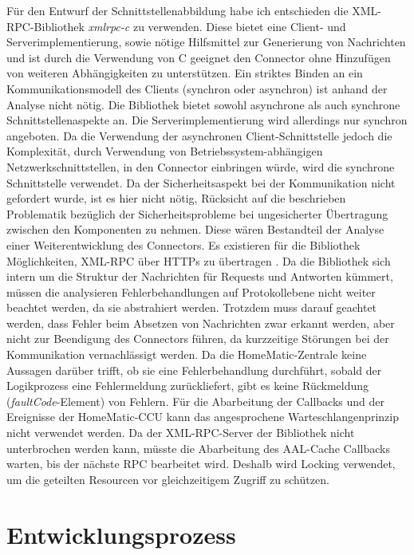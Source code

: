 Für den Entwurf der Schnittstellenabbildung habe ich entschieden die XML-RPC-Bibliothek \emph{xmlrpc-c} \cite{xmlrpc-c} zu verwenden.
Diese bietet eine Client- und Serverimplementierung, sowie nötige Hilfsmittel zur Generierung von Nachrichten und
 ist durch die Verwendung von C geeignet den Connector ohne Hinzufügen von weiteren Abhängigkeiten zu unterstützen.
Ein striktes Binden an ein Kommunikationsmodell des Clients (synchron oder asynchron) ist anhand der Analyse nicht nötig.
Die Bibliothek bietet sowohl asynchrone als auch synchrone Schnittstellenaspekte an.
Die Serverimplementierung wird allerdings nur synchron angeboten.
Da die Verwendung der asynchronen Client-Schnittstelle jedoch die Komplexität, durch Verwendung von Betriebssystem-abhängigen
Netzwerkschnittstellen, in den Connector einbringen würde, wird die synchrone Schnittstelle verwendet.
Da der Sicherheitsaspekt bei der Kommunikation nicht gefordert wurde, ist es hier nicht nötig, Rücksicht auf die
beschrieben Problematik bezüglich der Sicherheitsprobleme bei ungesicherter Übertragung zwischen den Komponenten zu nehmen.
Diese wären Bestandteil der Analyse einer Weiterentwicklung des Connectors.
Es existieren für die Bibliothek Möglichkeiten, XML-RPC über HTTPs zu übertragen \cite{xmlrpc_ssl}.
Da die Bibliothek sich intern um die Struktur der Nachrichten für Requests und Antworten kümmert, müssen die
analysieren Fehlerbehandlungen auf Protokollebene nicht weiter beachtet werden, da sie abstrahiert werden.
Trotzdem muss darauf geachtet werden, dass Fehler beim Absetzen von Nachrichten zwar erkannt werden, aber nicht
zur Beendigung des Connectors führen, da kurzzeitige Störungen bei der Kommunikation vernachlässigt werden.
Da die HomeMatic-Zentrale keine Aussagen darüber trifft, ob sie eine Fehlerbehandlung durchführt, sobald
der Logikprozess eine Fehlermeldung zurückliefert, gibt es keine Rückmeldung (\emph{faultCode}-Element)
von Fehlern.
Für die Abarbeitung der Callbacks und der Ereignisse der HomeMatic-CCU kann das angesprochene Warteschlangenprinzip
nicht verwendet werden.
Da der XML-RPC-Server der Bibliothek nicht unterbrochen werden kann, müsste die Abarbeitung des AAL-Cache
Callbacks warten, bis der nächste RPC bearbeitet wird.
Deshalb wird Locking verwendet, um die geteilten Resourcen vor gleichzeitigem Zugriff zu schützen.

\section{Entwicklungsprozess}
\label{ana_entwicklung}

